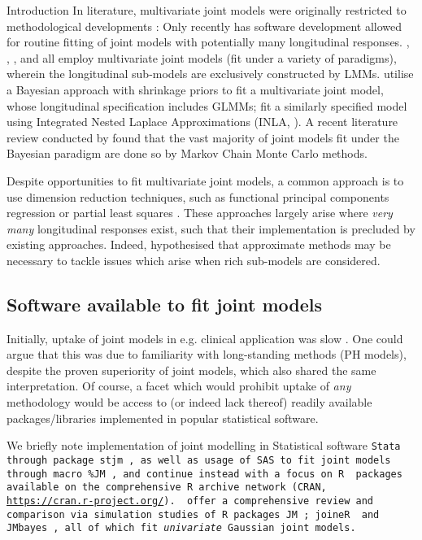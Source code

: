 \begin{chapter}{\label{cha:intro}Introduction}
  In literature, multivariate joint models were originally restricted to methodological developments \citep{Lin2002}: Only recently has software development allowed for routine fitting of joint models with potentially many longitudinal responses. \citet{Hickey2018}, \citet{Long2018}, \citet{Andrinopoulou2020}, and \citet{Philipson2020} all employ multivariate joint models (fit under a variety of paradigms), wherein the longitudinal sub-models are exclusively constructed by LMMs. \citet{PBCapp2} utilise a Bayesian approach with shrinkage priors to fit a multivariate joint model, whose longitudinal specification includes GLMMs; \citet{Rustand2023} fit a similarly specified model using Integrated Nested Laplace Approximations (INLA, \citet{R-INLA}). A recent literature review conducted by \citet{Alsefri2020} found that the vast majority of joint models fit under the Bayesian paradigm are done so by Markov Chain Monte Carlo methods.
  
  Despite opportunities to fit multivariate joint models, a common approach is to use dimension reduction techniques, such as functional principal components regression \citep{Li2017B, Li2021} or partial least squares \citep{Wang2020}. These approaches largely arise where \textit{very many} longitudinal responses exist, such that their implementation is precluded by existing approaches. Indeed, \citet{Hickey2018} hypothesised that approximate methods may be necessary to tackle issues which arise when rich sub-models are considered. 

  \subsection{Software available to fit joint models}\label{sec:intro-evolution-software}
  Initially, uptake of joint models in e.g. clinical application was slow \citep{Gould2015}. One could argue that this was due to familiarity with long-standing methods (\eg PH models), despite the proven superiority of joint models, which also shared the same interpretation. Of course, a facet which would prohibit uptake of \textit{any} methodology would be access to (or indeed lack thereof) readily available packages/libraries implemented in popular statistical software. 
  
  We briefly note implementation of joint modelling in Statistical software \tt{Stata} through package \tt{stjm} \citep{stata-stjm}, as well as usage of \tt{SAS} to fit joint models through macro \tt{\%JM} \citep{SAS-JM}, and continue instead with a focus on \tt{R} \citep{R-R} packages available on the comprehensive R archive network (CRAN, \url{https://cran.r-project.org/}). \citet{Furgal2019} offer a comprehensive review and comparison via simulation studies of \tt{R} packages \tt{JM} \citep{R-JM}; \tt{joineR} \citep{R-joineR} and \tt{JMbayes} \citep{R-JMbayes}, all of which fit \textit{univariate} Gaussian joint models.


\end{chapter}
